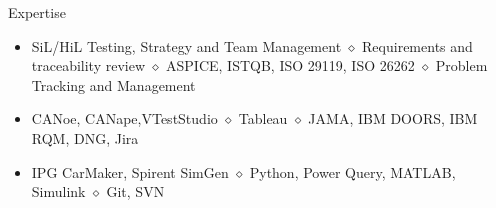 \documentclass{resume} %
\begin{document}
%		
	\begin{rSection}{Expertise}
	\begin{itemize}
						\fontsize{10pt}{12pt}\selectfont
		\item SiL/HiL Testing, Strategy and Team Management  \quad $\diamond$ Requirements and traceability review   \quad $\diamond$ ASPICE, ISTQB, ISO 29119, ISO 26262 \quad $\diamond$ Problem Tracking and Management
    	\item CANoe, CANape,VTestStudio  \enspace  $\diamond$  Tableau   \enspace\enspace  $\diamond$ JAMA, IBM DOORS, IBM RQM, DNG, Jira  
		\item IPG CarMaker, Spirent SimGen  \quad $\diamond$  Python, Power Query, MATLAB, Simulink   \enspace $\diamond$ Git, SVN 
	\end{itemize}
\end{rSection}
	
\end{document}
